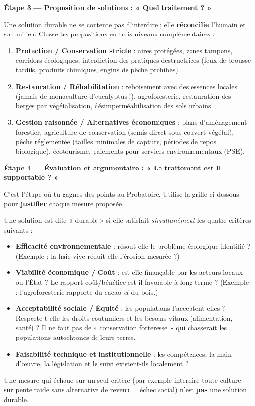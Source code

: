 \documentclass[11pt]{article}
\begin{document}
\textbf{Étape 3 — Proposition de solutions : « Quel traitement ? »}\par
Une solution durable ne se contente pas d'interdire ; elle \textbf{réconcilie} l'humain et son milieu. Classe tes propositions en trois niveaux complémentaires :
\begin{enumerate}
    \item \textbf{Protection / Conservation stricte} : aires protégées, zones tampons, corridors écologiques, interdiction des pratiques destructrices (feux de brousse tardifs, produits chimiques, engins de pêche prohibés).
    \item \textbf{Restauration / Réhabilitation} : reboisement avec des essences locales (jamais de monoculture d'eucalyptus !), agroforesterie, restauration des berges par végétalisation, désimperméabilisation des sols urbains.
    \item \textbf{Gestion raisonnée / Alternatives économiques} : plans d'aménagement forestier, agriculture de conservation (semis direct sous couvert végétal), pêche réglementée (tailles minimales de capture, périodes de repos biologique), écotourisme, paiements pour services environnementaux (PSE).
\end{enumerate}

\textbf{Étape 4 — Évaluation et argumentaire : « Le traitement est-il supportable ? »}\par
C'est l'étape où tu gagnes des points au Probatoire. Utilise la grille ci-dessous pour \textbf{justifier} chaque mesure proposée.

\begin{definition}
Une solution est dite « durable » si elle satisfait \emph{simultanément} les quatre critères suivants :
\begin{itemize}
    \item \textbf{Efficacité environnementale} : résout-elle le problème écologique identifié ? (Exemple : la haie vive réduit-elle l'érosion mesurée ?)
    \item \textbf{Viabilité économique / Coût} : est-elle finançable par les acteurs locaux ou l'État ? Le rapport coût/bénéfice est-il favorable à long terme ? (Exemple : l'agroforesterie rapporte du cacao \emph{et} du bois.)
    \item \textbf{Acceptabilité sociale / Équité} : les populations l'acceptent-elles ? Respecte-t-elle les droits coutumiers et les besoins vitaux (alimentation, santé) ? Il ne faut pas de « conservation forteresse » qui chasserait les populations autochtones de leurs terres.
    \item \textbf{Faisabilité technique et institutionnelle} : les compétences, la main-d'œuvre, la législation et le suivi existent-ils localement ?
\end{itemize}
Une mesure qui échoue sur un seul critère (par exemple interdire toute culture sur pente raide sans alternative de revenu = échec social) n'est \textbf{pas} une solution durable.
\end{definition}
\end{document}
